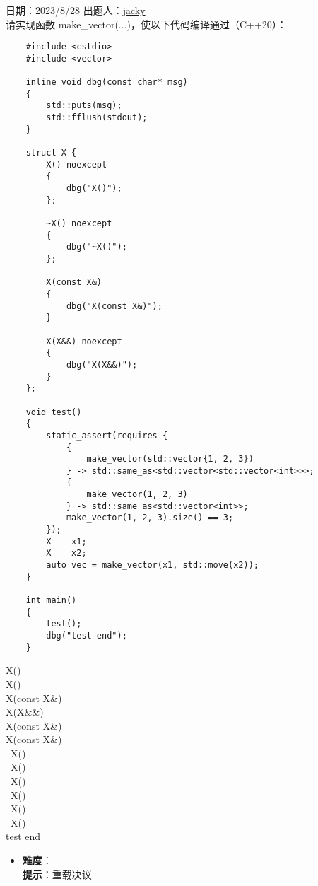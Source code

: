 日期：2023/8/28 出题人：\href{https://github.com/rsp4jack}{jacky}\\

请实现函数 make\_vector(...)，使以下代码编译通过（C++20）：

\begin{verbatim}
    #include <cstdio>
    #include <vector>
    
    inline void dbg(const char* msg)
    {
        std::puts(msg);
        std::fflush(stdout);
    }
    
    struct X {
        X() noexcept
        {
            dbg("X()");
        };
    
        ~X() noexcept
        {
            dbg("~X()");
        };
    
        X(const X&)
        {
            dbg("X(const X&)");
        }
    
        X(X&&) noexcept
        {
            dbg("X(X&&)");
        }
    };
    
    void test()
    {
        static_assert(requires {
            {
                make_vector(std::vector{1, 2, 3})
            } -> std::same_as<std::vector<std::vector<int>>>;
            {
                make_vector(1, 2, 3)
            } -> std::same_as<std::vector<int>>;
            make_vector(1, 2, 3).size() == 3;
        });
        X    x1;
        X    x2;
        auto vec = make_vector(x1, std::move(x2));
    }
    
    int main()
    {
        test();
        dbg("test end");
    }
\end{verbatim}

\begin{tcolorbox}[title = {要求运行结果},
    fonttitle = \bfseries, fontupper = \sffamily, fontlower = \itshape]
    X()             \\
    X()             \\
    X(const X\&)    \\
    X(X\&\&)        \\
    X(const X\&)    \\
    X(const X\&)    \\
    ~X()            \\
    ~X()            \\
    ~X()            \\
    ~X()            \\
    ~X()            \\
    ~X()            \\
    test end
\end{tcolorbox}

\begin{itemize}
    \item \textbf{难度}：  \\
          \textbf{提示}：重载决议
\end{itemize}